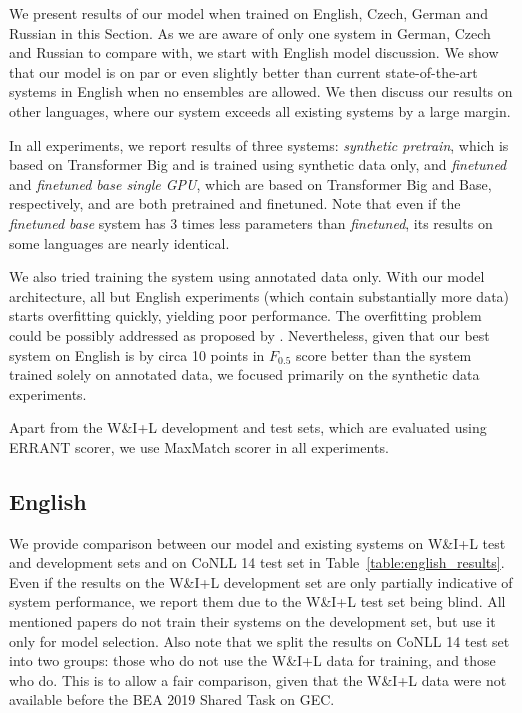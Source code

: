 \documentclass[11pt,a4paper]{article}
\begin{document}
We present results of our model when trained on English, Czech, German and Russian in this Section. As we are aware of only one system in German, Czech and Russian to compare with, we start with English model discussion. We show that our model is on par or even slightly better than current state-of-the-art systems in English when no ensembles are allowed. We then discuss our results on other languages, where our system exceeds all existing systems by a large margin.

In all experiments, we report results of three systems: \textit{synthetic pretrain}, which is based on Transformer Big and is trained using synthetic data only, and \textit{finetuned} and \textit{finetuned base single GPU}, which are based on Transformer Big and Base, respectively, and are both pretrained and finetuned. Note that even if the \textit{finetuned base} system has 3 times less parameters than \textit{finetuned}, its results on some languages are nearly identical.

We also tried training the system using annotated data only. With our model architecture, all but English experiments (which contain substantially more data) starts overfitting quickly, yielding poor performance. The overfitting problem could be possibly addressed as proposed by . Nevertheless, given that our best system on English is by circa 10 points in $F_{0.5}$ score better than the system trained solely on annotated data, we focused primarily on the synthetic data experiments. 

Apart from the W\&I+L development and test sets, which are evaluated using ERRANT scorer, we use MaxMatch scorer in all experiments.

\subsection{English}

We provide comparison between our model and existing systems on W\&I+L test and development sets and on CoNLL 14 test set in Table~\ref{table:english_results}. Even if the results on the W\&I+L development set are only partially indicative of system performance, we report them due to the W\&I+L test set being blind. All mentioned papers do not train their systems on the development set, but use it only for model selection. Also note that we split the results on CoNLL 14 test set into two groups: those who do not use the W\&I+L data for training, and those who do. This is to allow a fair comparison, given that the W\&I+L data were not available before the BEA 2019 Shared Task on GEC.
\end{document}
